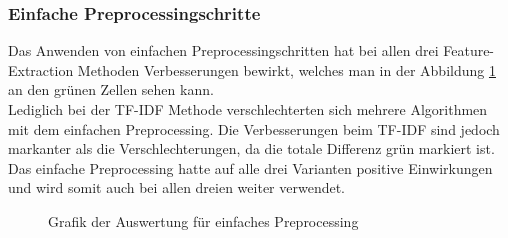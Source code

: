 \subsubsection{Einfache Preprocessingschritte}
Das Anwenden von einfachen Preprocessingschritten hat bei allen drei Feature-Extraction Methoden Verbesserungen bewirkt, welches man in der Abbildung \cref{abb:preprocess} an den grünen Zellen sehen kann.\\
Lediglich bei der TF-IDF Methode verschlechterten sich mehrere Algorithmen mit dem einfachen Preprocessing.
Die Verbesserungen beim TF-IDF sind jedoch markanter als die Verschlechterungen, da die totale Differenz grün markiert ist.\\
Das einfache Preprocessing hatte auf alle drei Varianten positive Einwirkungen und wird somit auch bei allen dreien weiter verwendet.
\begin{figure}[H]
	\setlength{\fboxsep}{0.3pt} 
	\setlength{\fboxrule}{0.3pt} 
	\caption{Grafik der Auswertung für einfaches Preprocessing}
	\label{abb:preprocess}
\end{figure}
